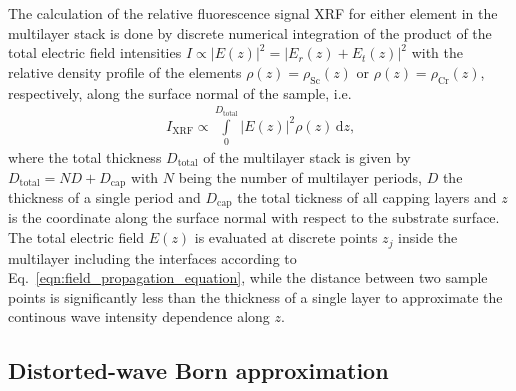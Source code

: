 The calculation of the relative fluorescence signal XRF for either element in the multilayer stack is done by discrete numerical integration of the product of the total electric field intensities $I \propto |E(z)|^2 = | E_r(z) + E_t(z)|^2$ with the relative density profile of the elements $\rho(z) = \rho_\text{Sc}(z)$ or $\rho(z) = \rho_\text{Cr}(z)$, respectively, along the surface normal of the sample, i.e.~
\begin{align}
 I_\text{XRF}\propto \int\limits_0^{D_\text{total}} |E(z)|^2 \rho(z) \,\text{d}z \text{,}
\end{align}
where the total thickness $D_\text{total}$ of the multilayer stack is given by $D_\text{total} = N D+D_\text{cap}$ with $N$ being the number of multilayer periods, $D$ the thickness of a single period and $D_\text{cap}$ the total tickness of all capping layers and $z$ is the coordinate along the surface normal with respect to the substrate surface. The total electric field $E(z)$ is evaluated at discrete points $z_j$ inside the multilayer including the interfaces according to Eq.~\eqref{eqn:field_propagation_equation}, while the distance between two sample points is significantly less than the thickness of a single layer to approximate the continous wave intensity dependence along $z$.
\subsection{Distorted-wave Born approximation} \label{subsec:dwba_formalism}


